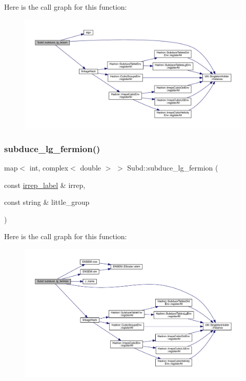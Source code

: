 Here is the call graph for this function\+:
\nopagebreak
\begin{figure}[H]
\begin{center}
\leavevmode
\includegraphics[width=350pt]{d8/d2b/namespaceSubd_a5f31b3ef70ad25320a8010ec3017eb04_cgraph}
\end{center}
\end{figure}
\mbox{\label{namespaceSubd_ae7ed68270fb8f7b5f574db245b085586}} 
\subsubsection{\texorpdfstring{subduce\_lg\_fermion()}{subduce\_lg\_fermion()}}
{\footnotesize\ttfamily map$<$ int, complex$<$ double $>$ $>$ Subd\+::subduce\+\_\+lg\+\_\+fermion (\begin{DoxyParamCaption}\item[{const \mbox{\hyperlink{structirrep__label}{irrep\+\_\+label}} \&}]{irrep,  }\item[{const string \&}]{little\+\_\+group }\end{DoxyParamCaption})}

Here is the call graph for this function\+:
\nopagebreak
\begin{figure}[H]
\begin{center}
\leavevmode
\includegraphics[width=350pt]{d8/d2b/namespaceSubd_ae7ed68270fb8f7b5f574db245b085586_cgraph}
\end{center}
\end{figure}
\mbox{\label{namespaceSubd_aa8b77162377de658856d44a4ac5aad26}} 
